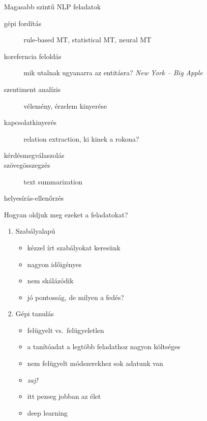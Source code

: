 \documentclass[xcolor=rgb]{beamer}
\begin{document}
\begin{frame}{Magasabb szintű NLP feladatok}
    \begin{description}
            \pause
        \item[gépi fordítás] rule-based MT, statistical MT, neural MT
            \pause
        \item[koreferncia feloldás] mik utalnak ugyanarra az entitásra? \emph{New York -- Big Apple}
            \pause
        \item[szentiment analízis] vélemény, érzelem kinyerése
            \pause
        \item[kapcsolatkinyerés] relation extraction, ki kinek a rokona?
            \pause
        \item[kérdésmegválaszolás]
            \pause
        \item[szövegösszegzés] text summarization
            \pause
        \item[helyesírás-ellenőrzés]
    \end{description}
\end{frame}


\begin{frame}{Hogyan oldjuk meg ezeket a feladatokat?}
    \begin{enumerate}
            \pause
        \item Szabályalapú
            \pause
            \begin{itemize}
                \item kézzel írt szabályokat keresünk
                    \pause
                \item nagyon időigényes
                    \pause
                \item nem skálázódik
                    \pause
                \item jó pontosság, de milyen a fedés?
            \end{itemize}
                    \pause
        \item Gépi tanulás
            \pause
            \begin{itemize}
                \item felügyelt vs.~felügyeletlen
                    \pause
                \item a tanítóadat a legtöbb feladathoz nagyon költséges
                    \pause
                \item nem felügyelt módszerekhez sok adatunk van
                    \pause
                \item \emph{zaj!}
                    \pause
                \item itt pezseg jobban az élet
                    \pause
                \item deep learning
            \end{itemize}
    \end{enumerate}
\end{frame}
\end{document}
